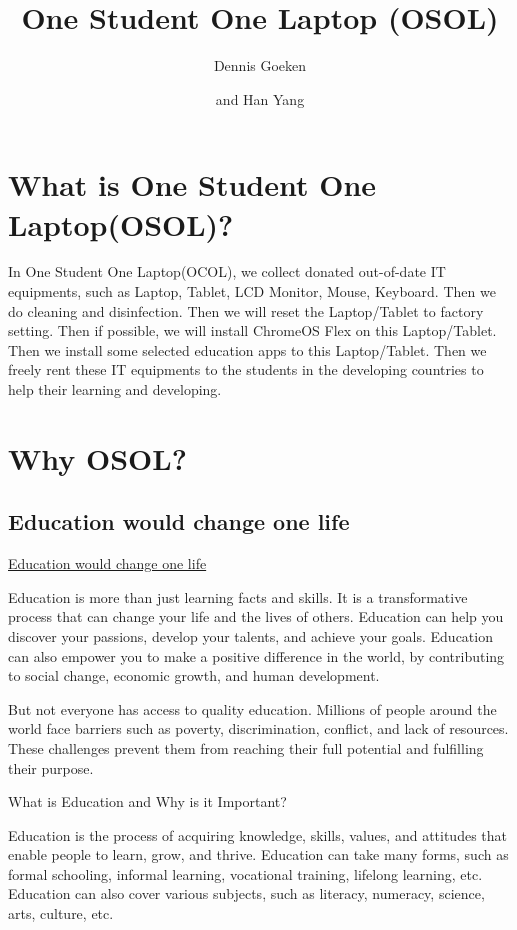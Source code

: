 \documentclass[a4paper,11pt]{article}
\title{One Student One Laptop (OSOL)}
\author{Dennis Goeken}
\author{and Han Yang}
\affiliation{IKAROS Shared Team, Riverty Group GmbH}
\begin{document}
\maketitle
\flushbottom

\section{What is One Student One Laptop(OSOL)?}
In One Student One Laptop(OCOL), we collect donated out-of-date IT equipments, such as Laptop, Tablet, LCD Monitor, Mouse, Keyboard. Then we do cleaning and disinfection. Then we will reset the Laptop/Tablet to factory setting. Then if possible, we will install ChromeOS Flex on this Laptop/Tablet. Then we install some selected education apps to this Laptop/Tablet. Then we freely rent these IT equipments to the students in the developing countries to help their learning and developing. 

\section{Why OSOL?}

\subsection{Education would change one life}
\href{https://www.unesco.org/en/education}{Education would change one life}

Education is more than just learning facts and skills. It is a transformative process that can change your life and the lives of others. Education can help you discover your passions, develop your talents, and achieve your goals. Education can also empower you to make a positive difference in the world, by contributing to social change, economic growth, and human development.

But not everyone has access to quality education. Millions of people around the world face barriers such as poverty, discrimination, conflict, and lack of resources. These challenges prevent them from reaching their full potential and fulfilling their purpose.\cite{education-change-life-world}

What is Education and Why is it Important?

Education is the process of acquiring knowledge, skills, values, and attitudes that enable people to learn, grow, and thrive. Education can take many forms, such as formal schooling, informal learning, vocational training, lifelong learning, etc. Education can also cover various subjects, such as literacy, numeracy, science, arts, culture, etc.
\end{document}

